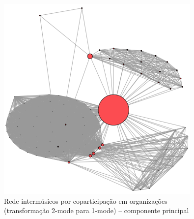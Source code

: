 \documentclass[a4paper, 12pt, openright, oneside, german, french, english, brazil]{abntex2}
\begin{document}
	
	\begin{figure}[!ht]
		\centering
		\caption{Rede intermúsicos por coparticipação em organizações (transformação 2-mode para 1-mode) -- componente principal}
		\label{rede:coparticipacao}
		\includegraphics[scale=.7]{mesonivel1.png}
	\end{figure}
	
	
	
	


		
\end{document}
